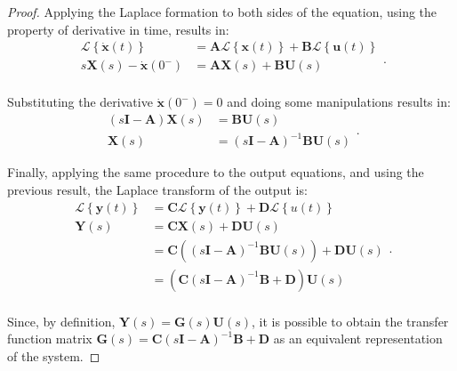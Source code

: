 \documentclass[a4paper,11pt]{book}
\numberwithin{figure}{chapter}
\numberwithin{equation}{chapter}
\numberwithin{table}{chapter}
\theoremstyle{definition}
\begin{document}
\begin{proof}
    Applying the Laplace formation to both sides of the equation, using the property of derivative in time, results in:
    \begin{equation} \label{eq:convertSSIO01}
    \begin{split}
        \mathcal{L} \left\{ \dot{\bm{x}}(t) \right\} &= \bm{A} \mathcal{L} \left\{ \bm{x}(t) \right\} + \bm{B} \mathcal{L} \left\{ \bm{u}(t) \right\} \\
        s \bm{X}(s) - \dot{\bm{x}}(0^-) &= \bm{A} \bm{X}(s) + \bm{B} \bm{U}(s) \\
    \end{split}
    .\end{equation}

\noindent Substituting the derivative $\dot{\bm{x}}(0^-) = 0$ and doing some manipulations results in:
	\begin{equation}
	\begin{split}
		(s\bm{I}  - \bm{A}) \bm{X}(s) &=  \bm{B} \bm{U}(s) \\
		\bm{X}(s) &= (s\bm{I}  - \bm{A})^{-1} \bm{B} \bm{U}(s)		
	\end{split}
	.\end{equation}    
    
\noindent Finally, applying the same procedure to the output equations, and using the previous result, the Laplace transform of the output is:
    \begin{equation} \label{eq:convertSSIO02}
    \begin{split}
        \mathcal{L} \left\{ \bm{y}(t) \right\} &= \bm{C} \mathcal{L} \left\{ \bm{y}(t) \right\} + \bm{D} \mathcal{L} \left\{ u(t) \right\} \\
        \bm{Y}(s)  &= \bm{C} \bm{X}(s) + \bm{D} \bm{U}(s) \\
          &= \bm{C} \left( (s\bm{I}  - \bm{A})^{-1} \bm{B} \bm{U}(s) \right) + \bm{D} \bm{U}(s) \\
          &= \left( \bm{C} (s\bm{I} - \bm{A})^{-1} \bm{B}   + \bm{D} \right) \bm{U}(s) \\
    \end{split}
    .\end{equation}
    
    Since, by definition, $\bm{Y}(s) = \bm{G}(s) \bm{U}(s)$, it is possible to obtain the transfer function matrix $\bm{G}(s) = \bm{C} (s\bm{I} - \bm{A})^{-1} \bm{B} + \bm{D}$ as an equivalent representation of the system.
\end{proof}
\end{document}
